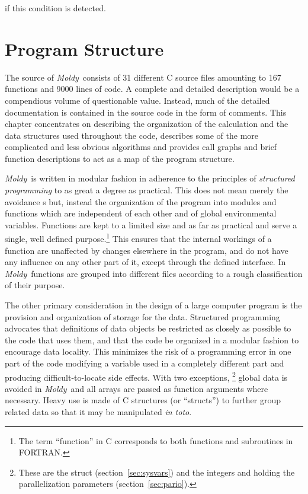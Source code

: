 \documentclass[a4paper,twoside]{report}
\newcommand{\moldy}{\emph{Moldy}}
\begin{document}
\noindent if this condition is detected.

\chapter{Program Structure} %
The source of \moldy\ consists of 31 different C source files
amounting to 167 functions and 9000 lines of code. A complete and
detailed description would be a compendious volume of questionable
value.  Instead, much of the detailed documentation is contained in
the source code in the form of comments. This chapter concentrates on
describing the organization of the calculation and the data structures
used throughout the code, describes some of the more complicated and
less obvious algorithms and provides call graphs and brief function
descriptions to act as a map of the program structure.

\moldy\ is written in modular fashion in adherence to the principles
of \emph{structured programming} to as great a degree as practical.
This does not mean merely the avoidance s but, instead
the organization of the program into modules and functions which are
independent of each other and of global environmental variables.
Functions are kept to a limited size and as far as practical and
serve a single, well defined purpose.\footnote{The term ``function''
  in C corresponds to both functions and subroutines in FORTRAN.} This
ensures that the internal workings of a function are unaffected by
changes elsewhere in the program, and do not have any influence on any
other part of it, except through the defined interface.  In \moldy\,
functions are grouped into different files according to a rough
classification of their purpose.  

The other primary consideration in the design of a large computer
program is the provision and organization of storage for the data.
Structured programming advocates that definitions of data objects be
restricted as closely as possible to the code that uses them, and that
the code be organized in a modular fashion to encourage data locality.
This minimizes the risk of a programming error in one part of the code
modifying a variable used in a completely different part and producing
difficult-to-locate side effects.  With two exceptions,%
\footnote{These are the struct 
  (section~\ref{sec:sysvars}) and the integers  and
   holding the parallelization parameters
  (section~\ref{sec:pario}).} global data is avoided in \moldy\ and
all arrays are passed as function arguments where necessary.  Heavy
use is made of C structures (or ``structs'') to further group related
data so that it may be manipulated \emph{in toto}.
\end{document}
